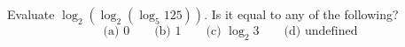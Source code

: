 Evaluate $\log_2\left(\log_2\left(\log_5 125\right)\right)$. Is it equal to any of the following?
\[
\text{(a) } 0\qquad\text{(b) } 1\qquad\text{(c) } \log_2 3\qquad\text{(d) undefined}
\]
